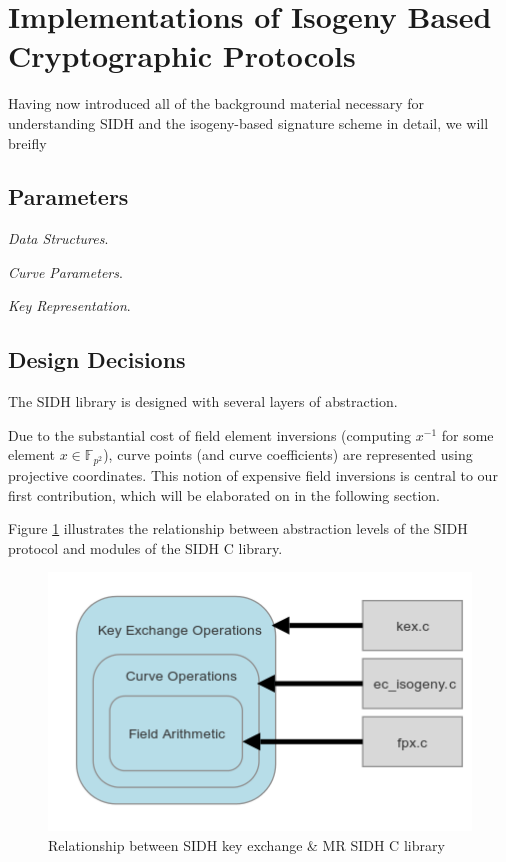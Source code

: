 \section{Implementations of Isogeny Based Cryptographic Protocols}

Having now introduced all of the background material necessary for understanding SIDH and the isogeny-based signature scheme in detail, we will breifly 

\subsection{Parameters}

\noindent
\emph{Data Structures}.

\noindent
\emph{Curve Parameters}.

\noindent
\emph{Key Representation}.

\subsection{Design Decisions}

The SIDH library is designed with several layers of abstraction. 

Due to the substantial cost of field element inversions (computing $x^{-1}$ for some element $x \in \mathbb{F}_{p^2}$), curve points (and curve coefficients) are represented using projective coordinates. This notion of expensive field inversions is central to our first contribution, which will be elaborated on in the following section.

Figure \ref{fig:halfmap} illustrates the relationship between abstraction levels of the SIDH protocol and modules of the SIDH C library.\\

\begin{figure}[htb]
\centering
\includegraphics[scale=0.7]{halfmapwcurve.png} %
\caption{Relationship between SIDH key exchange \& MR SIDH C library}
\label{fig:halfmap} %
\end{figure}

